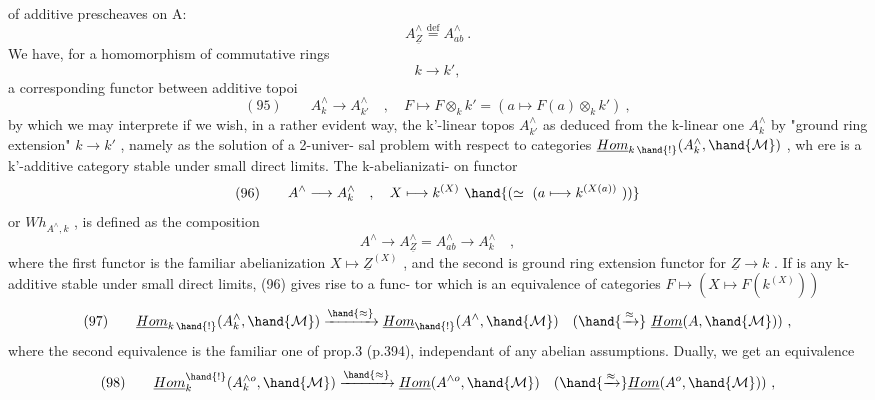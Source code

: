 
of additive prescheaves on A:
\[ A^{\wedge}_{\underline{Z}} \overset{\mathrm{def}}{=} A^{\wedge}_{ab} \ . \]
We have,  for a  homomorphism of commutative rings
\[ k \longrightarrow k' , \]
a corresponding functor between additive topoi
\[ (95) \qquad A^{\wedge}_{k} \longrightarrow A^{\wedge}_{k'} \quad , \quad F \longmapsto F\otimes_{k} k' = ( a \longmapsto F(a)\otimes_{k} k' ) \ , \]
by which we may interprete  if we wish,  in a rather evident way,
the  k'-linear topos $A^{\wedge}_{k'}$ as deduced from the k-linear one $A^{\wedge}_{k}$
by "ground ring extension" $k \to k'$ ,  namely as the solution of a 2-univer-%
sal problem with respect to categories $\underline{Hom}_{k\,\hand{!}}(A^{\wedge}_{k} , \hand{\mathcal{M}})$ ,  wh ere  is a
k'-additive category stable under small direct limits.  The k-abelianizati-%
on functor
\[ (96) \qquad A^{\wedge} \longrightarrow A^{\wedge}_{k} \quad , \quad X \longmapsto k^{(X)} \ \hand{(\simeq\ (a \longmapsto k^{(X(a))}\ ))} \]
or  $Wh_{A^{\wedge},k}$ ,  is defined as the composition
\[ A^{\wedge} \longrightarrow A^{\wedge}_{\underline{Z}} = A^{\wedge}_{ab} \longrightarrow A^{\wedge}_{k} \quad , \]
where the first functor is the familiar abelianization  $X \mapsto \underline{Z}^{(X)}$ ,  and
the second is  ground ring extension functor for $\underline{Z} \to k$ .  If  is any
k-additive  stable under small direct limits,  (96)  gives rise to a func-%
tor which is an equivalence of categories  $F \longmapsto (X \longmapsto F(k^{(X)}))$
\[ (97) \qquad \underline{Hom}_{k\,\hand{!}}(A^{\wedge}_{k} , \hand{\mathcal{M}}) \xrightarrow{\hand{\approx}} \underline{Hom}_{\hand{!}}(A^{\wedge} , \hand{\mathcal{M}}) \quad ( \hand{\xrightarrow{\approx}} \ \underline{Hom}(A, \hand{\mathcal{M}}) ) \ , \]
where the second equivalence is the familiar one of  prop.3 (p.394),
independant of any abelian assumptions.  Dually,  we get an equivalence
\[ (98) \qquad \underline{Hom}_{k}^{\hand{!}}(A^{\wedge o}_{k} , \hand{\mathcal{M}}) \xrightarrow{\hand{\approx}} \underline{Hom}(A^{\wedge o} , \hand{\mathcal{M}}) \quad ( \hand{\xrightarrow{\approx}} \underline{Hom}(A^{o} , \hand{\mathcal{M}}) ) \ , \]
